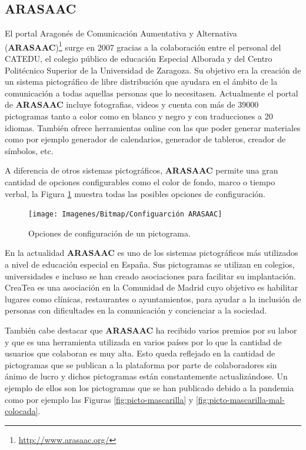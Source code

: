 \subsection{ARASAAC}

El portal Aragonés de Comunicación Aumentativa y Alternativa \\ (\textbf{ARASAAC})\footnote{\url{http://www.arasaac.org/}}
 surge en 2007 gracias a la colaboración entre el personal del CATEDU, el colegio público de educación Especial Alborada y del Centro Politécnico Superior de la Universidad de Zaragoza. Su objetivo era la creación de un sistema pictográfico de libre distribución que ayudara en el ámbito de la comunicación a todas aquellas personas que lo necesitasen.
Actualmente el portal de \textbf{ARASAAC} incluye fotografias, videos y cuenta con más de 39000 pictogramas tanto a color como en blanco y negro y con traducciones a 20 idiomas. También ofrece herramientas online con las que poder generar materiales como por ejemplo generador de calendarios, generador de tableros, creador de símbolos, etc.

A diferencia de otros sistemas pictográficos, \textbf{ARASAAC} permite una gran cantidad de opciones configurables como el color de fondo, marco o tiempo verbal, la Figura \ref{fig:configuarcion-arasaac} muestra todas las posibles opciones de configuración.



\begin{figure}[h!]
	\centering
	\texttt{[image: Imagenes/Bitmap/Configuarción ARASAAC]}
	\caption{Opciones de configuración de un pictograma.}
	\label{fig:configuarcion-arasaac}
\end{figure}



En la actualidad \textbf{ARASAAC} es uno de los sistemas pictográficos más utilizados a nivel de educación especial en España. Sus pictogramas se utilizan en colegios, universidades e incluso se han creado asociaciones para facilitar su implantación. CreaTea es una asociación en la Comunidad de Madrid cuyo objetivo es habilitar lugares como clínicas, restaurantes o ayuntamientos, para ayudar a la inclusión de personas con dificultades en la comunicación y concienciar a la sociedad.

También cabe destacar que \textbf{ARASAAC} ha recibido varios premios por su labor y que es una herramienta utilizada en varios países por lo que la cantidad de usuarios que colaboran es muy alta. Esto queda reflejado en la cantidad de pictogramas que se publican a la plataforma por parte de colaboradores sin ánimo de lucro y dichos pictogramas están constantemente actualizándose. Un ejemplo de ellos son los pictogramas que se han publicado debido a la pandemia como por ejemplo las Figuras \ref{fig:picto-mascarilla} y \ref{fig:picto-mascarilla-mal-colocada}.

